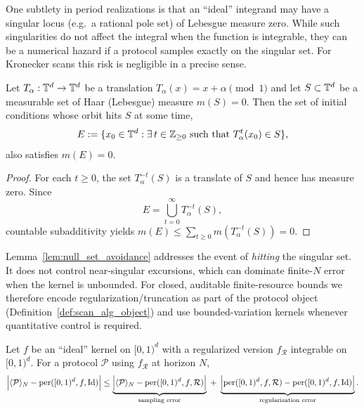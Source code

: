 One subtlety in period realizations is that an ``ideal'' integrand may have a singular locus (e.g.\ a rational pole set) of Lebesgue measure zero. While such singularities do not affect the integral when the function is integrable, they can be a numerical hazard if a protocol samples exactly on the singular set. For Kronecker scans this risk is negligible in a precise sense.

\begin{lemma}
\label{lem:null_set_avoidance}
Let $T_\alpha:\mathbb{T}^d\to\mathbb{T}^d$ be a translation $T_\alpha(x)=x+\alpha\pmod{1}$ and let $S\subset\mathbb{T}^d$ be a measurable set of Haar (Lebesgue) measure $m(S)=0$. Then the set of initial conditions whose orbit hits $S$ at some time,
\[
E:=\{x_0\in\TT^d:\exists\,t\in\ZZ_{\ge 0}\ \text{such that}\ T_\alpha^t(x_0)\in S\},
\]
also satisfies $m(E)=0$.
\end{lemma}

\begin{proof}
For each $t\ge 0$, the set $T_\alpha^{-t}(S)$ is a translate of $S$ and hence has measure zero. Since
\[
E=\bigcup_{t=0}^\infty T_\alpha^{-t}(S),
\]
countable subadditivity yields $m(E)\le \sum_{t\ge 0} m(T_\alpha^{-t}(S))=0$.
\end{proof}

\begin{remark}
\label{rem:why_regularize_even_if_avoids}
Lemma~\ref{lem:null_set_avoidance} addresses the event of \emph{hitting} the singular set. It does not control near-singular excursions, which can dominate finite-$N$ error when the kernel is unbounded. For closed, auditable finite-resource bounds we therefore encode regularization/truncation as part of the protocol object (Definition~\ref{def:scan_alg_object}) and use bounded-variation kernels whenever quantitative control is required.
\end{remark}

\begin{proposition}
\label{prop:error_decomposition}
Let $f$ be an ``ideal'' kernel on $[0,1)^d$ with a regularized version $f_{\mathcal{R}}$ integrable on $[0,1)^d$. For a protocol $\mathcal{P}$ using $f_{\mathcal{R}}$ at horizon $N$,
\begin{equation}
\label{eq:error_decomposition}
\Big|\langle \mathcal{P} \rangle_N-\mathrm{per}([0,1)^d,f,\mathrm{Id})\Big|
\le
\underbrace{\Big|\langle \mathcal{P} \rangle_N-\mathrm{per}([0,1)^d,f,\mathcal{R})\Big|}_{\text{sampling error}}
\;+\;
\underbrace{\Big|\mathrm{per}([0,1)^d,f,\mathcal{R})-\mathrm{per}([0,1)^d,f,\mathrm{Id})\Big|}_{\text{regularization error}}.
\end{equation}
\end{proposition}

